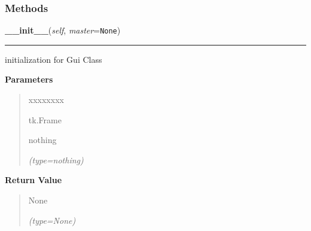   \subsubsection{Methods}

    \label{client_gui:GuiClass:__init__}

    \vspace{0.5ex}

\hspace{.8\funcindent}\begin{boxedminipage}{\funcwidth}

    \raggedright \textbf{\_\_init\_\_}(\textit{self}, \textit{master}={\tt None})

    \vspace{-1.5ex}

    \rule{\textwidth}{0.5\fboxrule}
\setlength{\parskip}{2ex}
    initialization for Gui Class

\setlength{\parskip}{1ex}
      \textbf{Parameters}
      \vspace{-1ex}

      \begin{quote}
        \begin{Ventry}{xxxxxxxx}

          \item[tk.Frame]

          nothing

            {\it (type=nothing)}

        \end{Ventry}

      \end{quote}

      \textbf{Return Value}
    \vspace{-1ex}

      \begin{quote}
      None

      {\it (type=None)}

      \end{quote}

    \end{boxedminipage}

    \label{client_gui:GuiClass:get_image}

    \vspace{0.5ex}


